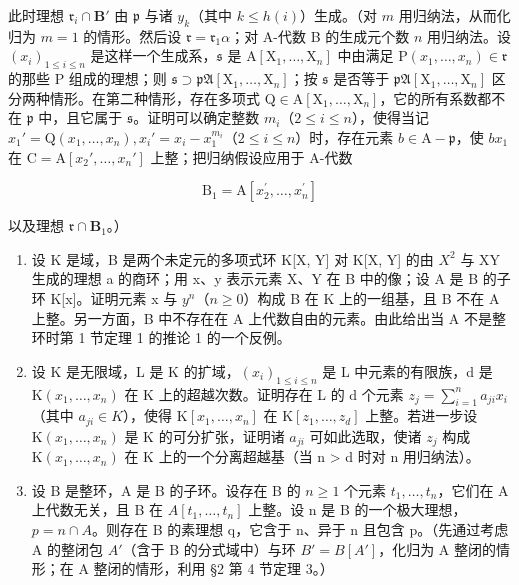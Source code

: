 此时理想 \(\mathfrak{r}_i\cap \mathbf{B}'\) 由 \(\mathfrak{p}\) 与诸 \(y_{k}\)（其中 \(k\leqslant h(i)\)）生成。（对 \(m\) 用归纳法，从而化归为 \(m = 1\) 的情形。然后设 \(\mathfrak{r} = \mathfrak{r}_1\alpha\)；对 A-代数 B 的生成元个数 \(n\) 用归纳法。设 \((x_{i})_{1\leqslant i\leqslant n}\) 是这样一个生成系，\(\mathfrak{s}\) 是 \(\mathrm{A}[\mathrm{X}_1,\dots ,\mathrm{X}_n]\) 中由满足 \(\mathrm{P}(x_1,\ldots ,x_n)\in \mathfrak{r}\) 的那些 P 组成的理想；则 \(\mathfrak{s}\supset \mathfrak{pA}[\mathrm{X}_1,\ldots ,\mathrm{X}_n]\)；按 \(\mathfrak{s}\) 是否等于 \(\mathfrak{pA}[\mathrm{X}_1,\ldots ,\mathrm{X}_n]\) 区分两种情形。在第二种情形，存在多项式 \(\mathrm{Q}\in \mathrm{A}[\mathrm{X}_1,\ldots ,\mathrm{X}_n]\)，它的所有系数都不在 \(\mathfrak{p}\) 中，且它属于 \(\mathfrak{s}\)。证明可以确定整数 \(m_i\)（\(2\leqslant i\leqslant n\)），使得当记 \(x_1' = \mathrm{Q}(x_1,\ldots ,x_n),x_i' = x_i - x_1^{m_i}\)（\(2\leqslant i\leqslant n\)）时，存在元素 \(b\in \mathrm{A} - \mathfrak{p}\)，使 \(bx_{1}\) 在 \(\mathrm{C} = \mathrm{A}[x_2',\ldots ,x_n']\) 上整；把归纳假设应用于 A-代数

\[
\mathrm{B} _ {1} = \mathrm{A} [ x _ {2} ^ {\prime}, \dots , x _ {n} ^ {\prime} ]
\]

以及理想 \(\mathfrak{r} \cap \mathbf{B}_1\)。）

\begin{enumerate}
\def\labelenumi{\arabic{enumi}.}
\setcounter{enumi}{1}
\item
  设 K 是域，B 是两个未定元的多项式环 K{[}X, Y{]} 对 K{[}X, Y{]} 的由 \(X^{2}\) 与 XY 生成的理想 a 的商环；用 x、y 表示元素 X、Y 在 B 中的像；设 A 是 B 的子环 K{[}x{]}。证明元素 x 与 \(y^{n}\)（\(n \geqslant 0\)）构成 B 在 K 上的一组基，且 B 不在 A 上整。另一方面，B 中不存在在 A 上代数自由的元素。由此给出当 A 不是整环时第 1 节定理 1 的推论 1 的一个反例。
\item
  设 K 是无限域，L 是 K 的扩域，\((x_{i})_{1 \leq i \leq n}\) 是 L 中元素的有限族，d 是 \(\mathrm{K}(x_{1}, \ldots, x_{n})\) 在 K 上的超越次数。证明存在 L 的 d 个元素 \(z_{j} = \sum_{i=1}^{n} a_{ji} x_{i}\)（其中 \(a_{ji} \in K\)），使得 \(\mathrm{K}[x_{1}, \ldots, x_{n}]\) 在 \(\mathrm{K}[z_{1}, \ldots, z_{d}]\) 上整。若进一步设 \(\mathrm{K}(x_{1}, \ldots, x_{n})\) 是 K 的可分扩张，证明诸 \(a_{ji}\) 可如此选取，使诸 \(z_{j}\) 构成 \(\mathrm{K}(x_{1}, \ldots, x_{n})\) 在 K 上的一个分离超越基（当 n \textgreater{} d 时对 n 用归纳法）。
\item
  设 B 是整环，A 是 B 的子环。设存在 B 的 \(n \geqslant 1\) 个元素 \(t_{1}, \ldots, t_{n}\)，它们在 A 上代数无关，且 B 在 \(A[t_{1}, \ldots, t_{n}]\) 上整。设 n 是 B 的一个极大理想，\(p = n \cap A\)。则存在 B 的素理想 q，它含于 n、异于 n 且包含 p。（先通过考虑 A 的整闭包 \(A'\)（含于 B 的分式域中）与环 \(B' = B[A']\)，化归为 A 整闭的情形；在 A 整闭的情形，利用 §2 第 4 节定理 3。）
\end{enumerate}

